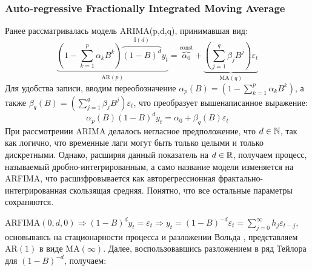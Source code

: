 \subsubsection{Auto-regressive Fractionally Integrated Moving Average}
Ранее рассматривалась модель ARIMA(p,d,q), принимавшая вид:
\begin{equation}
	\underbrace{\left(1 - \sum_{k = 1}^{p} \alpha_k B^k\right) \overbrace{(1 - B)^d}^{\text{I}(d)} y_t}_{\text{AR}(p)} = \overbrace{\alpha_0}^{\text{const}} + \underbrace{\left(\sum_{j = 1}^{q} \beta_j B^j\right) \varepsilon_{t}}_{\text{MA}(q)}
\end{equation}
Для удобства записи, вводим переобозначение $\alpha_p(B) = \left(1 - \sum_{k = 1}^{p} \alpha_k B^k\right)$, а также $\beta_{q}(B) = \left(\sum_{j = 1}^{q} \beta_j B^j\right) \varepsilon_{t}$, что преобразует вышенаписанное выражение:
\begin{equation}
	\alpha_p(B) (1 - B)^d y_t = \alpha_0 + \beta_{q}(B) \varepsilon_{t}
\end{equation}
При рассмотрении ARIMA делалось негласное предположение, что $d \in \mathbb{N}$, так как логично, что временные лаги могут быть только целыми и только дискретными. Однако, расширяя данный показатель \cite{fractal_market} на $d \in \mathbb{R}$, получаем процесс, называемый дробно-интегрированным, а само название модели изменяется на ARFIMA, что расшифровывается как авторегрессионная фрактально-интегрированная скользящая средняя. Понятно, что все остальные параметры сохраняются.

ARFIMA$(0, d, 0) \Rightarrow (1 - B)^{d}y_t = \varepsilon_{t} \Rightarrow y_t = (1 - B)^{-d}\varepsilon_t = \sum_{j = 0}^{\infty} h_j\varepsilon_{t - j}$, основываясь на стационарности процесса и разложении Вольда \cite{wold_decomposition}, представляем AR$(1)$ в виде MA$(\infty)$. Далее, воспользовавшись разложением в ряд Тейлора для $(1 - B)^{-d}$, получаем:

